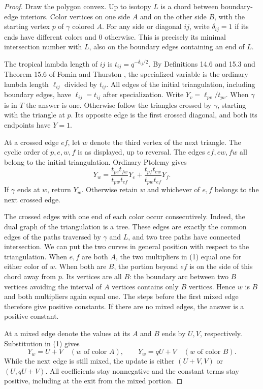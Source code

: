 \documentclass[11pt]{article}
\begin{document}
\begin{proof}
Draw the polygon convex. Up to isotopy $L$ is a chord between boundary-edge
interiors. Color vertices on one side $A$ and on the other side $B$, with the
starting vertex $p$ of $\gamma$ colored $A$. For any side or diagonal $ij$,
write $\delta_{ij}=1$ if its ends have different colors and $0$ otherwise.
This is precisely its minimal intersection number with $L$, also on the
boundary edges containing an end of $L$.

The tropical lambda length of $ij$ is $t_{ij}=q^{-\delta_{ij}/2}$.
By Definitions 14.6 and 15.3 and Theorem 15.6 of Fomin and Thurston
\cite{ft}, the specialized variable is the ordinary lambda length
$\ell_{ij}$ divided by $t_{ij}$. All edges of the initial triangulation,
including boundary edges, have $\ell_{ij}=t_{ij}$ after specialization.
Write $Y_v=\ell_{pv}/t_{pv}$. When $\gamma$ is in $T$ the answer is one.
Otherwise follow the triangles crossed by $\gamma$, starting with the triangle
at $p$. Its opposite edge is the first crossed diagonal, and both its endpoints
have $Y=1$.

At a crossed edge $ef$, let $w$ denote the third vertex of the next triangle.
The cyclic order of $p,e,w,f$ is as displayed, up to reversal. The edges
$ef,ew,fw$ all belong to the initial triangulation. Ordinary Ptolemy gives
\[
 Y_w = \frac{t_{pe}t_{fw}}{t_{pw}t_{ef}}Y_e+
        \frac{t_{pf}t_{ew}}{t_{pw}t_{ef}}Y_f.                       \tag{1}
\]
If $\gamma$ ends at $w$, return $Y_w$. Otherwise retain $w$ and whichever
of $e,f$ belongs to the next crossed edge.

The crossed edges with one end of each color occur consecutively. Indeed, the
dual graph of the triangulation is a tree. These edges are exactly the common
edges of the paths traversed by $\gamma$ and $L$, and two tree paths have
connected intersection. We can put the two curves in general position with
respect to the triangulation. When $e,f$ are both $A$, the two multipliers in
(1) equal one for either color of $w$. When both are $B$, the portion beyond
$ef$ is on the side of this chord away from $p$. Its vertices are all $B$:
the boundary arc between two $B$ vertices avoiding the interval of $A$ vertices
contains only $B$ vertices. Hence $w$ is $B$ and both multipliers again equal
one. The steps before the first mixed edge therefore give positive constants.
If there are no mixed edges, the answer is a positive constant.

At a mixed edge denote the values at its $A$ and $B$ ends by $U,V$,
respectively. Substitution in (1) gives
\[
       Y_w=U+V\quad(w\text{ of color }A),\qquad
       Y_w=qU+V\quad(w\text{ of color }B).                          \tag{2}
\]
While the next edge is still mixed, the update is either $(U+V,V)$ or
$(U,qU+V)$. All coefficients stay nonnegative and the constant terms stay
positive, including at the exit from the mixed portion.


\end{proof}
\end{document}
